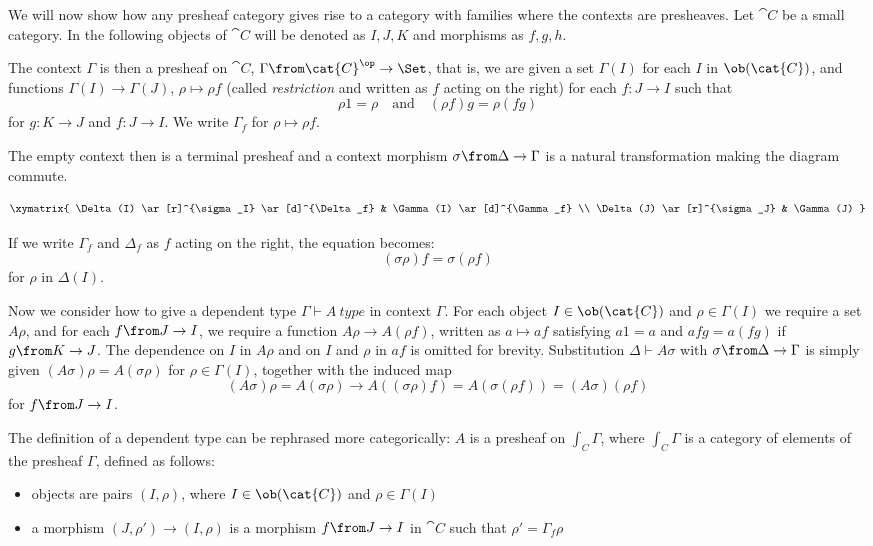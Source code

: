 We will now show how any presheaf category gives rise to a category with
families where the contexts are presheaves.  Let $\cat{C}$ be a small category.
In the following objects of $\cat{C}$ will be denoted as $I,J,K$ and morphisms
as $f,g,h$.

The context $\Gamma$ is then a presheaf on $\cat{C}$, $\Gamma \from
\cat{C}^\op \to \Set$, that is, we are given a set $\Gamma(I)$ for each
$I$ in $\ob(\cat{C})$, and functions $\Gamma(I) \to \Gamma(J)$, $\rho \mapsto \rho
f$ (called \emph{restriction} and written as $f$ acting on the right) for each
$f: J \to I$ such that
\[
  \rho 1 = \rho \quad \text{and} \quad (\rho f) g = \rho (f g)
\]
for $g: K \to J$ and $f: J \to I$. We write $\Gamma_f$ for $\rho \mapsto \rho
f$.

The empty context then is a terminal presheaf and a context morphism $\sigma
\from \Delta \to \Gamma$ is a natural transformation making the diagram
commute.

\[
  \xymatrix{
    \Delta(I) \ar[r]^{\sigma_I} \ar[d]^{\Delta_f} & \Gamma(I) \ar[d]^{\Gamma_f} \\
    \Delta(J) \ar[r]^{\sigma_J} & \Gamma(J)
  }
\]

If we write $\Gamma_f$ and $\Delta_f$ as $f$ acting on the right, the
equation becomes:
\[
  (\sigma \rho) f = \sigma (\rho f)
\]
for $\rho$ in $\Delta(I)$.

Now we consider how to give a dependent type $\Gamma \vdash A~type$ in context
$\Gamma$. For each object $I \in \ob(\cat{C})$ and $\rho \in \Gamma(I)$ we require a
set $A \rho$, and for each $f \from J \to I$, we require a function $A \rho \to
A (\rho f)$, written as $a \mapsto af$ satisfying $a1 = a$ and $afg = a (f g)$
if $g \from K \to J$. The dependence on $I$ in $A\rho$ and on $I$ and $\rho$ in
$af$ is omitted for brevity. Substitution $\Delta \vdash A \sigma$ with $\sigma
\from \Delta \to \Gamma$ is simply given $(A \sigma) \rho = A (\sigma \rho)$
for $\rho \in \Gamma(I)$, together with the induced map
\[
  (A\sigma)\rho = A (\sigma \rho) \to A ((\sigma \rho)f) = A (\sigma (\rho f)) = (A \sigma) (\rho f)
\]
for $f \from J \to I$.

The definition of a dependent type can be rephrased more categorically: $A$ is
a presheaf on $\int_C \Gamma$, where $\int_C \Gamma$ is a category of elements
of the presheaf $\Gamma$, defined as follows:
\begin{itemize}
  \item objects are pairs $(I, \rho)$, where $I \in \ob(\cat{C})$ and $\rho \in
    \Gamma(I)$
  \item a morphism $(J, \rho') \to (I, \rho)$ is a morphism $f \from J \to I$
    in $\cat{C}$ such that $\rho' = \Gamma_f \rho$
\end{itemize}


